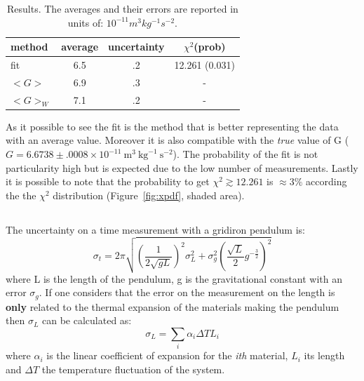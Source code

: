 \documentclass[twocolumn]{article}
\begin{document}
	\begin{table}[htpb]
		\caption{Results. The averages and their errors are reported in units of: $10^{-11} m^3 kg^{-1} s^{-2}$.}
		\label{tab:res}
		\begin{center}
			\begin{tabular}{l|ccc}
			\hline

			\hline
			\textbf{method} & \textbf{average} & \textbf{uncertainty} & \textbf{$\chi ^2 $(prob)} \\
			\hline
			fit & 6.5 & .2 & 12.261 (0.031) \\
			$<G> $ & 6.9 & .3 & - \\
			$<G>_W$ &  7.1 & .2 & - \\
			\hline
			\hline
			\end{tabular}
		\end{center}
	\end{table}

	As it possible to see the fit is the method that is better representing the data with an average value.
	Moreover it is also compatible with the \emph{true} value of G ($ G = 6.6738 \pm .0008  \times 10^{-11} \ \mbox{m}^3 \ \mbox{kg}^{-1} \ \mbox{s}^{-2} $).
	The probability of the fit is not particularity high but is expected due to the low number of measurements.
	Lastly it is possible to note that the probability to get $\chi ^2 \gtrsim 12.261 $ is $ \approx 3 \% $ according the the $\chi ^2$ distribution (Figure~\ref{fig:xpdf}, shaded area).
\subsection{} %
\label{sub:gridiron}
	The uncertainty on a time measurement with a gridiron pendulum is:
	\begin{equation}
		\sigma_t  = 2 \pi \sqrt{ (\frac{1}{2 \sqrt{g L }} ) ^{2} \sigma_L ^2 +
		\sigma_g ^2 (\frac{\sqrt{L}}{2} g^{-\frac{3}{2}})^2
		}
	\end{equation}
	where L is the length of the pendulum, g is the gravitational constant with an error $\sigma_g$.
	If one considers that the error on the measurement on the length is \textbf{only} related to the thermal expansion of the materials making the pendulum then $\sigma_L$ can be calculated as:
	\begin{equation}
		\sigma_L = \sum_i \alpha_i  \Delta T  L_i
	\end{equation}
	where $\alpha_i$ is the linear coefficient of expansion for the \emph{ith} material, $L_i$ its length and $\Delta T $ the temperature fluctuation of the system.
\end{document}
